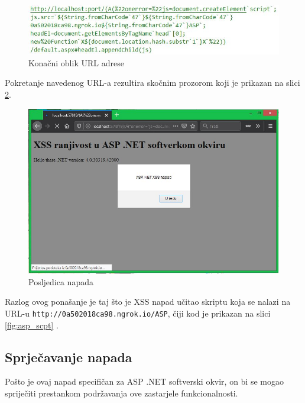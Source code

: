 \documentclass[12pt, oneside, onecolumn]{book}
\begin{document}
{\begin{figure}[H]
	\begin{center}
		\includegraphics[width=\textwidth]{asp_final.jpg}
		\caption{Konačni oblik URL adrese} \label{fig:asp_final}
	\end{center}
\end{figure}

Pokretanje navedenog URL-a rezultira skočnim prozorom koji je prikazan na slici \ref{fig:asp_atc}.

\begin{figure}[H]
	\begin{center}
		\includegraphics[width=\textwidth]{asp_atc.jpg}
		\caption{Posljedica napada} \label{fig:asp_atc}
	\end{center}
\end{figure}

Razlog ovog ponašanje je taj što je XSS napad učitao skriptu koja se nalazi na URL-u \texttt{http://0a502018ca98.ngrok.io/ASP}, čiji kod je prikazan na slici \ref{fig:asp_scpt} \cite{annapad}.

\pagebreak

\subsection{Sprječavanje napada}
Pošto je ovaj napad specifičan za ASP .NET softverski okvir, on bi se mogao spriječiti prestankom podržavanja ove zastarjele funkcionalnosti.

}
\end{document}
